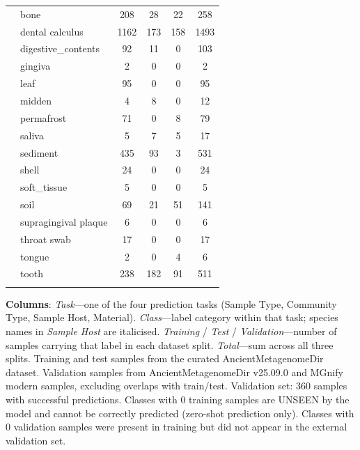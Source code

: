 \begin{longtable}{lp{4.5cm}cccc}
 & bone & 208 & 28 & 22 & 258 \\
 & dental calculus & 1162 & 173 & 158 & 1493 \\
 & digestive\_contents & 92 & 11 & 0 & 103 \\
 & gingiva & 2 & 0 & 0 & 2 \\
 & leaf & 95 & 0 & 0 & 95 \\
 & midden & 4 & 8 & 0 & 12 \\
 & permafrost & 71 & 0 & 8 & 79 \\
 & saliva & 5 & 7 & 5 & 17 \\
 & sediment & 435 & 93 & 3 & 531 \\
 & shell & 24 & 0 & 0 & 24 \\
 & soft\_tissue & 5 & 0 & 0 & 5 \\
 & soil & 69 & 21 & 51 & 141 \\
 & supragingival plaque & 6 & 0 & 0 & 6 \\
 & throat swab & 17 & 0 & 0 & 17 \\
 & tongue & 2 & 0 & 4 & 6 \\
 & tooth & 238 & 182 & 91 & 511 \\
\addlinespace
\end{longtable}
{\footnotesize \textbf{Columns}: \textit{Task}---one of the four prediction tasks (Sample Type, Community Type, Sample Host, Material). \textit{Class}---label category within that task; species names in \textit{Sample Host} are italicised. \textit{Training} / \textit{Test} / \textit{Validation}---number of samples carrying that label in each dataset split. \textit{Total}---sum across all three splits. Training and test samples from the curated AncientMetagenomeDir dataset. Validation samples from AncientMetagenomeDir v25.09.0 and MGnify modern samples, excluding overlaps with train/test. Validation set: 360 samples with successful predictions. Classes with 0 training samples are UNSEEN by the model and cannot be correctly predicted (zero-shot prediction only). Classes with 0 validation samples were present in training but did not appear in the external validation set.}